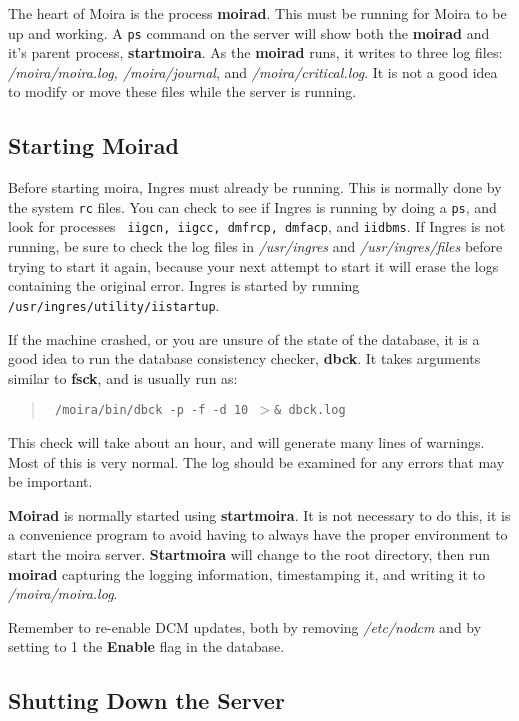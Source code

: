 \documentclass{book}
\begin{document}
The heart of Moira is the process {\bf moirad}.  This must be running
for Moira to be up and working.  A {\tt ps} command on the server will
show both the {\bf moirad} and it's parent process, {\bf startmoira}.
As the {\bf moirad} runs, it writes to three log files: {\it
/moira/moira.log, /moira/journal}, and {\it /moira/critical.log}.  It
is not a good idea to modify or move these files while the server is
running.

\subsection{Starting {\bf Moirad}}

Before starting moira, Ingres must already be running.  This is
normally done by the system {\tt rc} files.  You can check to see if
Ingres is running by doing a {\tt ps}, and look for processes {\tt
iigcn, iigcc, dmfrcp, dmfacp}, and {\tt iidbms}.  If Ingres is not
running, be sure to check the log files in {\it /usr/ingres} and {\it
/usr/ingres/files} before trying to start it again, because your next
attempt to start it will erase the logs containing the original error.
Ingres is started by running {\tt /usr/ingres/utility/iistartup}.

If the machine crashed, or you are unsure of the state of the
database, it is a good idea to run the database consistency checker,
{\bf dbck}.  It takes arguments similar to {\bf fsck}, and is usually
run as:
\begin{quotation}\tt
/moira/bin/dbck -p -f -d 10 $>$\& dbck.log
\end{quotation}
This check will take about an hour, and will generate many lines of
warnings.  Most of this is very normal.  The log should be examined
for any errors that may be important.

{\bf Moirad} is normally started using {\bf startmoira}.
  It is not necessary to do this, it is a
convenience program to avoid having to always have the proper
environment to start the moira server.  {\bf Startmoira} will change to
the root directory, then run {\bf moirad} capturing the logging
information, timestamping it, and writing it to {\em /moira/moira.log}.

Remember to re-enable {\bf} DCM updates, both by removing {\em
/etc/nodcm} and by setting to 1 the {\bf Enable} flag in the database.

\subsection{Shutting Down the Server}
\end{document}
